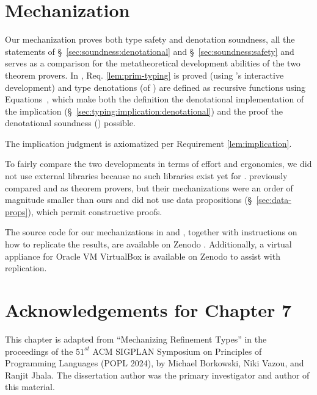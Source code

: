 \section{\coq Mechanization}
\label{sec:coq}
\label{sec:implementation:coq}

Our \coq mechanization 
proves both type safety and
denotation soundness, \ie all the statements of \S~\ref{sec:soundness:denotational}
and \S~\ref{sec:soundness:safety}
and serves as a comparison for the metatheoretical 
development abilities of the two theorem provers. 
%
%
In \coq, 
Req. \ref{lem:prim-typing} 
is proved (using \coq's interactive development)
and type denotations (of )
are defined as recursive functions using 
Equations~\cite{10.1145/3341690}, 
which make both the 
definition the denotational implementation
of the implication (\S~\ref{sec:typing:implication:denotational})
and the proof  
the denotational soundness ()
possible. 
\begin{fullversion}
    The implication judgment
    is  axiomatized per Requirement \ref{lem:implication}.
\end{fullversion}
%
To fairly compare the two developments
in terms of effort and ergonomics,
we did not use external \coq libraries 
because no such libraries exist yet for \lh.
%
\citet{Vazou17} previously compared \lh and \coq 
as theorem provers, but their mechanizations were an order of magnitude
smaller than ours and did not use data propositions (\S~\ref{sec:data-props}),
which permit constructive \lh proofs. 

The source code for our mechanizations in \coq and \lh, 
together with instructions on how to replicate the results, 
are available on Zenodo \cite{michael_h_borkowski_2023_8425960}. 
%
Additionally, a virtual appliance for Oracle VM VirtualBox 
is available on Zenodo \cite{michael_h_borkowski_2023_8425176}
to assist with replication.

\section*{Acknowledgements for Chapter 7}
%
This chapter is adapted from 
``Mechanizing Refinement Types'' in the proceedings of the 
$51^{st}$ ACM SIGPLAN Symposium on Principles of Programming
Languages (POPL 2024), by Michael Borkowski, Niki Vazou, and
Ranjit Jhala.
%
The dissertation author was the primary investigator 
and author of this material.